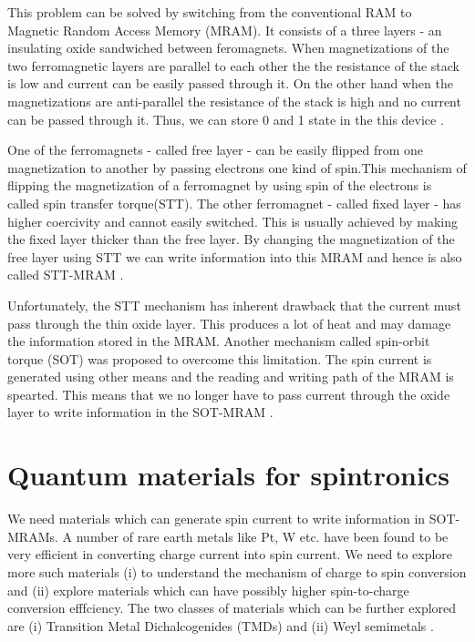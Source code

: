 This problem can be solved by switching from the conventional RAM to Magnetic Random Access Memory (MRAM). 
It consists of a three layers - an insulating oxide sandwiched between feromagnets. 
When magnetizations of the two ferromagnetic layers are parallel to each other the the 
resistance of the stack is low and current can be easily passed through it. On the other 
hand when the magnetizations are anti-parallel the resistance of the stack is high and no 
current can be passed through it. Thus, we can store 0 and 1 state in the 
this device \cite{Inomata2001}.

One of the ferromagnets - called free layer - can be easily flipped from one 
magnetization to another by passing electrons one kind of spin.This mechanism 
of flipping the magnetization of a ferromagnet by using spin of the electrons
is called spin transfer torque(STT). The other ferromagnet - called fixed layer - has higher
coercivity and cannot easily switched. This is usually achieved by making the fixed layer 
thicker than the free layer. By changing the magnetization of the free layer 
using STT we can write information into this MRAM and hence is also called
STT-MRAM \cite{Hirota2002}.

Unfortunately, the STT mechanism has inherent drawback that the current must pass through
the thin oxide layer. This produces a lot of heat and may damage the information stored in the
MRAM. Another mechanism called spin-orbit torque (SOT) was proposed to overcome this limitation.
The spin current is generated using other means and the reading and writing path of the 
MRAM is spearted. This means that we no longer have to pass current through the oxide
layer to write information in the SOT-MRAM \cite{spintronic-sarma}.

\section{Quantum materials for spintronics}
We need materials which can generate spin current to write information in
SOT-MRAMs. A number of rare earth metals like Pt, W etc.  have been found to be very efficient
in converting charge current into spin current. We need to explore more such materials
(i) to understand the mechanism of charge to spin conversion and (ii) explore materials
which can have possibly higher spin-to-charge conversion efffciency. The two classes of
materials which can be further explored are (i) Transition Metal Dichalcogenides (TMDs) and 
(ii) Weyl semimetals \cite{TokuaraEmergent}.

